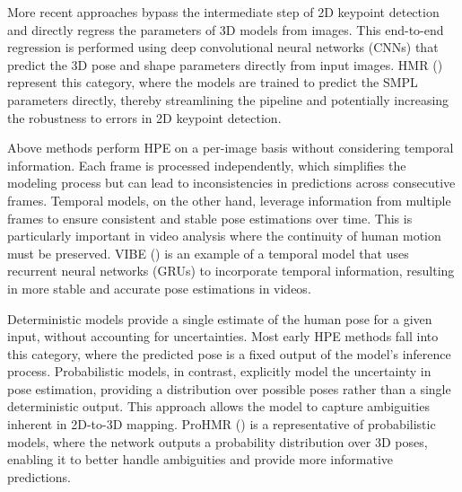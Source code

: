 More recent approaches bypass the intermediate step of 2D keypoint detection and directly regress the parameters of 3D models from images. This end-to-end regression is performed using deep convolutional neural networks (CNNs) that predict the 3D pose and shape parameters directly from input images. HMR (\cite{hmrKanazawa17}) represent this category, where the models are trained to predict the SMPL parameters directly, thereby streamlining the pipeline and potentially increasing the robustness to errors in 2D keypoint detection.

Above methods perform HPE on a per-image basis without considering temporal information. Each frame is processed independently, which simplifies the modeling process but can lead to inconsistencies in predictions across consecutive frames.
Temporal models, on the other hand, leverage information from multiple frames to ensure consistent and stable pose estimations over time. This is particularly important in video analysis where the continuity of human motion must be preserved. VIBE (\cite{kocabas2019vibe}) is an example of a temporal model that uses recurrent neural networks (GRUs) to incorporate temporal information, resulting in more stable and accurate pose estimations in videos.

Deterministic models provide a single estimate of the human pose for a given input, without accounting for uncertainties. Most early HPE methods fall into this category, where the predicted 
pose is a fixed output of the model's inference process.
Probabilistic models, in contrast, explicitly model the uncertainty in pose estimation, providing a distribution over possible poses rather than a single deterministic output. This approach allows the model to capture ambiguities inherent in 2D-to-3D mapping. ProHMR (\cite{kolotouros2021prohmr}) is a representative of probabilistic models, where the network outputs a probability distribution over 3D poses, enabling it to better handle ambiguities and provide more informative predictions.


